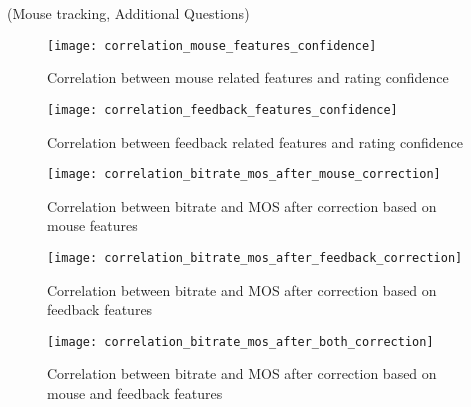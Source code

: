 (Mouse tracking, Additional Questions) 


\begin{figure}[h]
	\centering
	\texttt{[image: correlation\_mouse\_features\_confidence]}
	\caption{Correlation between mouse related features and rating confidence}
	\label{fig:result:correlation_mouse_features_outlierness}
\end{figure}


\begin{figure}[h]
\centering
\texttt{[image: correlation\_feedback\_features\_confidence]}
\caption{Correlation between feedback related features and rating confidence}
\label{fig:result:correlation_feedback_features_confidence}
\end{figure}


\begin{figure}[h]
\centering
\texttt{[image: correlation\_bitrate\_mos\_after\_mouse\_correction]}
\caption{Correlation between bitrate and MOS after correction based on mouse features}
\label{fig:result:correlation_bitrate_mos_after_mouse_correction}
\end{figure}


\begin{figure}[h]
\centering
\texttt{[image: correlation\_bitrate\_mos\_after\_feedback\_correction]}
\caption{Correlation between bitrate and MOS after correction based on feedback features}
\label{fig:result:correlation_bitrate_mos_after_feedback_correction}
\end{figure}


\begin{figure}[h]
\centering
\texttt{[image: correlation\_bitrate\_mos\_after\_both\_correction]}
\caption{Correlation between bitrate and MOS after correction based on mouse and feedback features}
\label{fig:result:correlation_bitrate_mos_after_both_correction}
\end{figure}